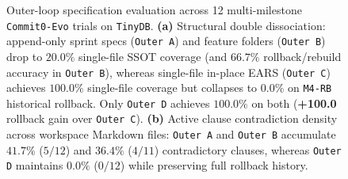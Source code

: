 \documentclass[11pt,a4paper,copyright]{google}
\begin{document}
\begin{figure}[t!]
\caption{Outer-loop specification evaluation across 12 multi-milestone \texttt{Commit0-Evo} trials on \texttt{TinyDB}. \textbf{(a)} Structural double dissociation: append-only sprint specs (\texttt{Outer A}) and feature folders (\texttt{Outer B}) drop to $20.0\%$ single-file SSOT coverage (and $66.7\%$ rollback/rebuild accuracy in \texttt{Outer B}), whereas single-file in-place EARS (\texttt{Outer C}) achieves $100.0\%$ single-file coverage but collapses to $0.0\%$ on \texttt{M4-RB} historical rollback. Only \texttt{Outer D} achieves $100.0\%$ on both (\textcolor{evalPass}{\textbf{+100.0}} rollback gain over \texttt{Outer C}). \textbf{(b)} Active clause contradiction density across workspace Markdown files: \texttt{Outer A} and \texttt{Outer B} accumulate $41.7\%$ ($5/12$) and $36.4\%$ ($4/11$) contradictory clauses, whereas \texttt{Outer D} maintains $0.0\%$ ($0/12$) while preserving full rollback history.}
\label{fig:suite2_rollback_chart}
\end{figure}
\end{document}
